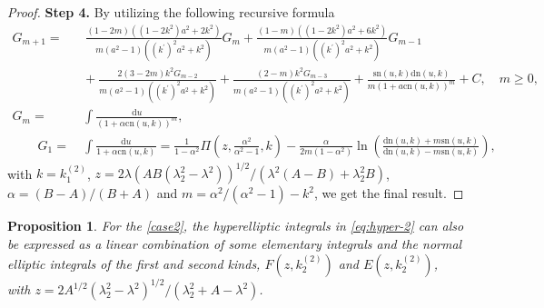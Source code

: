 \documentclass[11pt,reqno]{amsart}
\newcommand{\sn}{\mathrm{sn}}
\newcommand{\cn}{\mathrm{cn}}
\newcommand{\dn}{\mathrm{dn}}
\newcommand{\dd}{\mathrm{d}}
\newtheorem{prop}{Proposition}
\numberwithin{equation}{section}
\begin{document}
\begin{proof}
	
	\textbf{Step 4.}
	By utilizing the following recursive formula \cite{ByrdF-54} 
	\begin{equation}\nonumber
		\begin{split}
			G_{m+1} = &\ \ \frac{(1-2m)((1-2k^2)a^2+2k^2)}{m(a^2-1)((k^{\prime })^2a^2+k^2)}G_m+\frac{(1-m)((1-2k^2)a^2+6k^2)}{m(a^2-1)((k^{\prime })^2a^2+k^2)}G_{m-1}\\
			&\ +\frac{2(3-2m)k^2 G_{m-2}}{m(a^2-1)((k^{\prime })^2a^2+k^2)}
			+\frac{(2-m)k^2G_{m-3}}{m(a^2-1)((k^{\prime })^2a^2+k^2)}
			+\frac{\sn(u,k)\dn(u,k)}{m(1+a\cn(u,k))^{m}}+C,\quad m\ge 0, \\
			G_m=&\  \int \frac{\dd u}{(1+\alpha\cn(u,k))^m},\\ \qquad 
			G_1=&\   \int\frac{\dd u}{1+\alpha \cn(u,k)}=\frac{1}{1-\alpha^2}\Pi\left(z, \frac{\alpha^2}{\alpha^2-1},k\right)
			 - \frac{\alpha}{2m(1-\alpha^2)} \ln\left(\frac{\dn(u,k)+m\sn(u,k)}{\dn(u,k)-m\sn(u,k)}\right), %
		\end{split}
	\end{equation}
	with $k=k^{(2)}_1$, $z=2\lambda(AB(\lambda_2^2-\lambda^2))^{1/2}/(\lambda^2(A-B)+\lambda_2^2B)$, $\alpha=(B-A)/(B+A)$ and $m=\alpha^2/(\alpha^2-1)-k^2$,
	we get the final result.	
\end{proof}



\begin{prop}\label{prop:case-2-C}
	For the \ref{case2}, the hyperelliptic integrals in \eqref{eq:hyper-2} can also be expressed as a linear combination of some elementary integrals and the normal elliptic integrals of the first and second kinds, $F(z,k_2^{(2)})$ and $E(z,k_2^{(2)})$, with $z=2A^{1/2}(\lambda_2^2-\lambda^2)^{1/2}/(\lambda_2^2+A-\lambda^2)$.
\end{prop}
\end{document}
